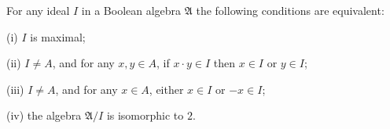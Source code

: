 For any ideal $I$ in a Boolean algebra $\mathfrak{A}$ the following conditions are equivalent:

(i) $I$ is maximal;

(ii) $I \neq A$, and for any $x, y \in A$, if $x \cdot y \in I$ then $x \in I$ or $y \in I$;

(iii) $I \neq A$, and for any $x \in A$, either $x \in I$ or $-x \in I$;

(iv) the algebra $\mathfrak{A}/I$ is isomorphic to $2$.
